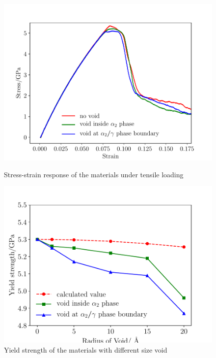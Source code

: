 \documentclass[materials,article,submit,moreauthors,pdftex,10pt,a4paper]{Definitions/mdpi}
\begin{document}
\begin{figure}[ht]
	\centering
	\begin{minipage}{0.495\textwidth}
		\includegraphics[width=1\linewidth]{img/allline}
		\centering
		\caption{Stress-strain response of the materials under tensile loading}
		\label{fig:stress&strain}
	\end{minipage}	
	\hfill
	\begin{minipage}{0.495\textwidth}		
		\includegraphics[width=1\linewidth]{img/effect_of_vol}
		\centering
		\caption{Yield strength of the materials with different size void}
		\label{fig:strength}
	\end{minipage}
\end{figure}
\end{document}
